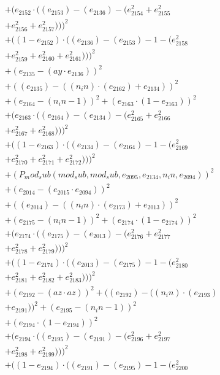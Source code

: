 \documentclass[10pt, a4paper]{article}
\begin{document}
\begin{align*}
& + (e_{2152}  \cdot  ((e_{2153}) - (e_{2136}) - (e_{2154}^{2} + e_{2155}^{2} \\
& + e_{2156}^{2} + e_{2157}^{2})))^{2} \\
& + ((1 - e_{2152})  \cdot  ((e_{2136}) - (e_{2153}) - 1 - (e_{2158}^{2} \\
& + e_{2159}^{2} + e_{2160}^{2} + e_{2161}^{2})))^{2} \\
& + (e_{2135} - (ay  \cdot  e_{2136}))^{2} \\
& + ((e_{2135}) - ((n_in)  \cdot  (e_{2162}) + e_{2134}))^{2} \\
& + (e_{2164} - (n_in - 1))^{2} + (e_{2163}  \cdot  (1 - e_{2163}))^{2} \\
& + (e_{2163}  \cdot  ((e_{2164}) - (e_{2134}) - (e_{2165}^{2} + e_{2166}^{2} \\
& + e_{2167}^{2} + e_{2168}^{2})))^{2} \\
& + ((1 - e_{2163})  \cdot  ((e_{2134}) - (e_{2164}) - 1 - (e_{2169}^{2} \\
& + e_{2170}^{2} + e_{2171}^{2} + e_{2172}^{2})))^{2} \\
& + (P_mod_sub(mod_sub, mod_sub, e_{2095}, e_{2134}, n_in, e_{2094}))^{2} \\
& + (e_{2014} - (e_{2015}  \cdot  e_{2094}))^{2} \\
& + ((e_{2014}) - ((n_in)  \cdot  (e_{2173}) + e_{2013}))^{2} \\
& + (e_{2175} - (n_in - 1))^{2} + (e_{2174}  \cdot  (1 - e_{2174}))^{2} \\
& + (e_{2174}  \cdot  ((e_{2175}) - (e_{2013}) - (e_{2176}^{2} + e_{2177}^{2} \\
& + e_{2178}^{2} + e_{2179}^{2})))^{2} \\
& + ((1 - e_{2174})  \cdot  ((e_{2013}) - (e_{2175}) - 1 - (e_{2180}^{2} \\
& + e_{2181}^{2} + e_{2182}^{2} + e_{2183}^{2})))^{2} \\
& + (e_{2192} - (az  \cdot  az))^{2} + ((e_{2192}) - ((n_in)  \cdot  (e_{2193}) \\
& + e_{2191}))^{2} + (e_{2195} - (n_in - 1))^{2} \\
& + (e_{2194}  \cdot  (1 - e_{2194}))^{2} \\
& + (e_{2194}  \cdot  ((e_{2195}) - (e_{2191}) - (e_{2196}^{2} + e_{2197}^{2} \\
& + e_{2198}^{2} + e_{2199}^{2})))^{2} \\
& + ((1 - e_{2194})  \cdot  ((e_{2191}) - (e_{2195}) - 1 - (e_{2200}^{2} \\

\end{align*}
\end{document}

